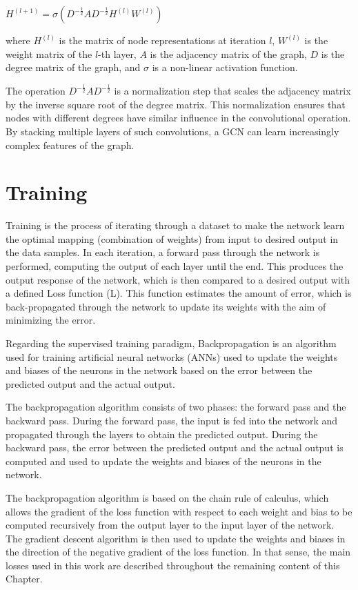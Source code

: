 $H^{(l+1)} = \sigma(D^{-\frac{1}{2}} A D^{-\frac{1}{2}} H^{(l)} W^{(l)})$

where $H^{(l)}$ is the matrix of node representations at iteration $l$, $W^{(l)}$ is the weight matrix of the $l$-th layer, $A$ is the adjacency matrix of the graph, $D$ is the degree matrix of the graph, and $\sigma$ is a non-linear activation function.

The operation $D^{-\frac{1}{2}} A D^{-\frac{1}{2}}$ is a normalization step that scales the adjacency matrix by the inverse square root of the degree matrix. This normalization ensures that nodes with different degrees have similar influence in the convolutional operation. By stacking multiple layers of such convolutions, a GCN can learn increasingly complex features of the graph.

\section{Training}
\label{sec:3_training}

Training is the process of iterating through a dataset to make the network learn the optimal mapping (combination of weights) from input to desired output in the data samples. In each iteration, a forward pass through the network is performed, computing the output of each layer until the end. This produces the output response of the network, which is then compared to a desired output with a defined Loss function (L). This function estimates the amount of error, which is back-propagated through the network to update its weights with the aim of minimizing the error. 

Regarding the supervised training paradigm, Backpropagation is an algorithm used for training artificial neural networks (ANNs) used to update the weights and biases of the neurons in the network based on the error between the predicted output and the actual output.

The backpropagation algorithm consists of two phases: the forward pass and the backward pass. During the forward pass, the input is fed into the network and propagated through the layers to obtain the predicted output. During the backward pass, the error between the predicted output and the actual output is computed and used to update the weights and biases of the neurons in the network.

The backpropagation algorithm is based on the chain rule of calculus, which allows the gradient of the loss function with respect to each weight and bias to be computed recursively from the output layer to the input layer of the network. The gradient descent algorithm is then used to update the weights and biases in the direction of the negative gradient of the loss function. In that sense, the main losses used in this work are described throughout the remaining content of this Chapter.

